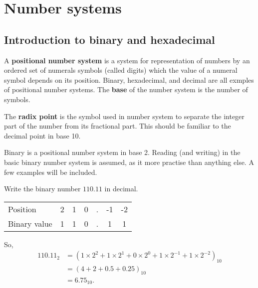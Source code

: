 \chapter{Number systems}

\section{Introduction to binary and hexadecimal}

\begin{definition}
    A \textbf{positional number system} is a system for representation of numbers by an ordered set of numerals symbols (called digits) which the value of a numeral symbol depends on its position. Binary, hexadecimal, and decimal are all exmples of positional number systems. The \textbf{base} of the number system is the number of symbols. 
\end{definition}

\begin{definition}
    The \textbf{radix point} is the symbol used in number system to separate the integer part of the number from its fractional part. This should be familiar to the decimal point in base 10.
\end{definition}

Binary is a positional number system in base 2. Reading (and writing) in the basic binary number system is assumed, as it more practise than anything else. A few examples will be included.

\begin{example}
    Write the binary number $110.11$ in decimal.
\end{example}

\begin{solution}
    \hspace{0em}
    \begin{center}
        \begin{tabular}{lcccccc}
            \toprule
            Position & 2 & 1 & 0 & . & -1 & -2 \\
            Binary value & 1 & 1 & 0 & . & 1 & 1 \\
            \bottomrule
        \end{tabular}
    \end{center}
    So, 
    \begin{align*}
        110.11_2 &= (1 \times 2^2 + 1 \times 2^1 + 0 \times 2^0 + 1 \times 2^{-1} + 1 \times 2^{-2})_{10} \\
        &= \left( 4 + 2 + 0.5 + 0.25 \right)_{10} \\
        &= 6.75_{10}.
    \end{align*}
\end{solution}

